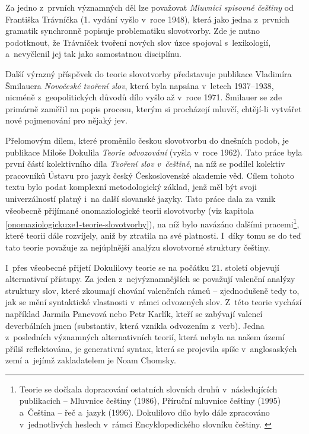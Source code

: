Za jedno z~prvních významných děl lze považovat \emph{Mluvnici spisovné
češtiny} od Františka Trávníčka (1. vydání vyšlo v~roce 1948), která
jako jedna z~prvních gramatik synchronně popisuje problematiku
slovotvorby. Zde je nutno podotknout, že Trávníček tvoření nových slov
úzce spojoval s~lexikologií, a~nevyčlenil jej tak jako samostatnou
disciplínu. \parencite[263]{rousinova07}

Další výrazný příspěvek do teorie slovotvorby představuje publikace
Vladimíra Šmilauera \emph{Novočeské tvoření slov}, která byla napsána
v~letech 1937--1938, nicméně z~geopolitických důvodů dílo vyšlo až v~roce
1971. Šmilauer se zde primárně zaměřil na popis procesu, kterým si
procházejí mluvčí, chtějí-li vytvářet nové pojmenování pro nějaký jev.
\parencite[265]{rousinova07}

Přelomovým dílem, které proměnilo českou slovotvorbu do dnešních podob,
je publikace Miloše Dokulila \emph{Teorie odvozování} (vyšla v~roce
1962). Tato práce byla první částí kolektivního díla \emph{Tvoření slov
v~češtině}, na níž se podílel kolektiv pracovníků Ústavu pro jazyk český
Československé akademie věd. Cílem tohoto textu bylo podat komplexní
metodologický základ, jenž měl být svoji univerzálností platný i~na
další slovanské jazyky. \parencite[267]{rousinova07} Tato práce dala za
vznik všeobecně přijímané onomaziologické teorii slovotvorby (viz
kapitola \ref{onomaziologickuxe1-teorie-slovotvorby}), na níž bylo
navázáno dalšími
pracemi\footnote{Teorie se dočkala dopracování ostatních slovních druhů v~následujících publikacích -- Mluvnice češtiny (1986), Příruční mluvnice češtiny (1995) a~Čeština -- řeč a~jazyk (1996). Dokulilovo dílo bylo dále zpracováno v~jednotlivých heslech v~rámci Encyklopedického slovníku češtiny. \parencite[272]{rousinova07}},
které teorii dále rozvíjely, aniž by ztratila na své platnosti.
\parencite[272]{rousinova07} I~díky tomu se do teď tato teorie považuje
za nejúplnější analýzu slovotvorné struktury češtiny.
\parencite[273]{zikova07}

I~přes všeobecné přijetí Dokulilovy teorie se na počátku 21. století
objevují alternativní přístupy. Za jeden z~nejvýznamnějších se považují
valenční analýzy struktury slov, které zkoumají chování valenčních rámců
-- zjednodušeně tedy to, jak se mění syntaktické vlastnosti v~rámci
odvozených slov. Z~této teorie vychází například Jarmila Panevová nebo
Petr Karlík, kteří se zabývají valencí deverbálních jmen (substantiv,
která vznikla odvozením z~verb). Jedna z~posledních významných
alternativních teorií, která nebyla na našem území příliš reflektována,
je generativní syntax, která se projevila spíše v~anglosaských zemí
a~jejímž zakladatelem je Noam Chomsky. \parencite[274--275]{zikova07}

